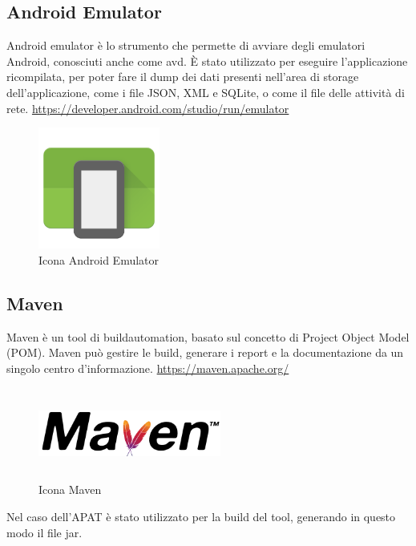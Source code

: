 \subsection*{Android Emulator}
Android emulator è lo strumento che permette di avviare degli emulatori Android, conosciuti anche come \gls{avd}.
È stato utilizzato per eseguire l'applicazione ricompilata, per poter fare il dump dei dati presenti nell'area di storage dell'applicazione, come i file JSON, XML e SQLite, o come il file delle attività di rete.
\url{https://developer.android.com/studio/run/emulator}
\begin{figure}[H]
    \centering
    \includegraphics[width=4cm, height=4cm]{./immagini/emulator.png}
    \caption{Icona Android Emulator}\label{fig:emulator}
\end{figure}

\subsection*{Maven}
Maven è un tool di \gls{buildautomation}, basato sul concetto di Project Object Model (POM). Maven può gestire le build, generare i report e la documentazione da un singolo centro d'informazione.
\url{https://maven.apache.org/}
\begin{figure}[H]
    \centering
    \includegraphics[width=6cm, height=3cm]{./immagini/maven.png}
    \caption{Icona Maven}\label{fig:maven}
\end{figure}
Nel caso dell'APAT è stato utilizzato per la build del tool, generando in questo modo il file jar.

